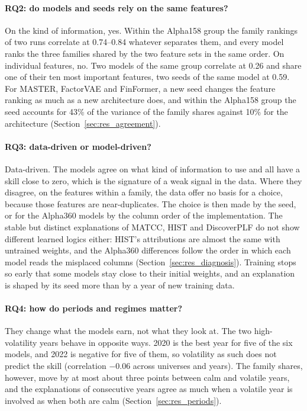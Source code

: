 \paragraph{RQ2: do models and seeds rely on the same features?} On the kind of information, yes. Within the Alpha158 group the family rankings of two runs correlate at 0.74--0.84 whatever separates them, and every model ranks the three families shared by the two feature sets in the same order. On individual features, no. Two models of the same group correlate at 0.26 and share one of their ten most important features, two seeds of the same model at 0.59. For MASTER, FactorVAE and FinFormer, a new seed changes the feature ranking as much as a new architecture does, and within the Alpha158 group the seed accounts for 43\% of the variance of the family shares against 10\% for the architecture (Section~\ref{sec:res_agreement}).

\paragraph{RQ3: data-driven or model-driven?} Data-driven. The models agree on what kind of information to use and all have a skill close to zero, which is the signature of a weak signal in the data. Where they disagree, on the features within a family, the data offer no basis for a choice, because those features are near-duplicates. The choice is then made by the seed, or for the Alpha360 models by the column order of the implementation. The stable but distinct explanations of MATCC, HIST and DiscoverPLF do not show different learned logics either: HIST's attributions are almost the same with untrained weights, and the Alpha360 differences follow the order in which each model reads the misplaced columns (Section~\ref{sec:res_diagnosis}). Training stops so early that some models stay close to their initial weights, and an explanation is shaped by its seed more than by a year of new training data.

\paragraph{RQ4: how do periods and regimes matter?} They change what the models earn, not what they look at. The two high-volatility years behave in opposite ways. 2020 is the best year for five of the six models, and 2022 is negative for five of them, so volatility as such does not predict the skill (correlation $-0.06$ across universes and years). The family shares, however, move by at most about three points between calm and volatile years, and the explanations of consecutive years agree as much when a volatile year is involved as when both are calm (Section~\ref{sec:res_periods}).

